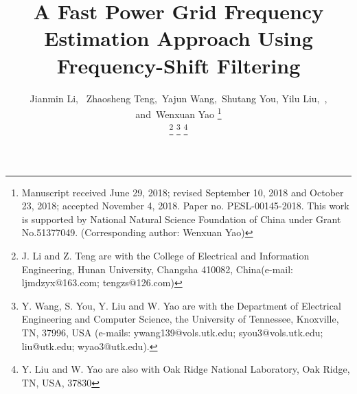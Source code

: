 \documentclass[journal,twoside]{IEEEtran}
\begin{document}
%
\title{A Fast Power Grid Frequency Estimation Approach Using Frequency-Shift Filtering}
%
%
%
\author{Jianmin Li,~
		Zhaosheng Teng,~Yajun Wang,~Shutang You,
		Yilu Liu,~, and~Wenxuan Yao%
			\thanks{Manuscript received  June 29, 2018; revised  September 10, 2018 and October 23, 2018; accepted November 4, 2018. Paper no. PESL-00145-2018. This work is supported by National Natural Science Foundation of China under Grant No.51377049. (Corresponding author: Wenxuan Yao)} 
			
		\thanks{J.  Li and Z. Teng are with the College of Electrical and Information Engineering, Hunan University, Changsha 410082, China(e-mail: ljmdzyx@163.com; tengzs@126.com)} %
		\thanks{Y. Wang, S. You, Y. Liu and W. Yao are with the Department of Electrical Engineering and Computer Science, the University of Tennessee, Knoxville, TN, 37996, USA (e-mails: ywang139@vols.utk.edu; syou3@vols.utk.edu; liu@utk.edu; wyao3@utk.edu).}
		\thanks{Y. Liu and W. Yao are also with  Oak Ridge National Laboratory, Oak Ridge, TN, USA, 37830}
		}%

% 
%
\end{document}
